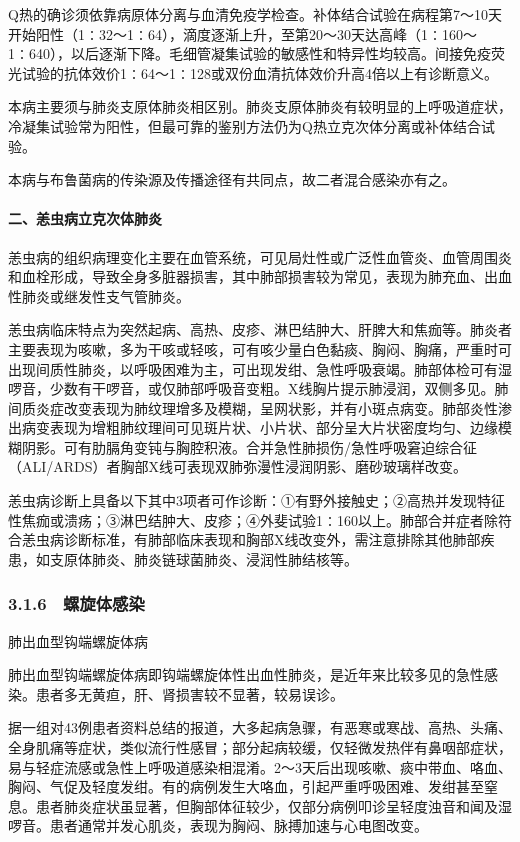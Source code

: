 Q热的确诊须依靠病原体分离与血清免疫学检查。补体结合试验在病程第7～10天开始阳性（1∶32～1∶64），滴度逐渐上升，至第20～30天达高峰（1∶160～1∶640），以后逐渐下降。毛细管凝集试验的敏感性和特异性均较高。间接免疫荧光试验的抗体效价1∶64～1∶128或双份血清抗体效价升高4倍以上有诊断意义。

本病主要须与肺炎支原体肺炎相区别。肺炎支原体肺炎有较明显的上呼吸道症状，冷凝集试验常为阳性，但最可靠的鉴别方法仍为Q热立克次体分离或补体结合试验。

本病与布鲁菌病的传染源及传播途径有共同点，故二者混合感染亦有之。

\paragraph{二、恙虫病立克次体肺炎}

恙虫病的组织病理变化主要在血管系统，可见局灶性或广泛性血管炎、血管周围炎和血栓形成，导致全身多脏器损害，其中肺部损害较为常见，表现为肺充血、出血性肺炎或继发性支气管肺炎。

恙虫病临床特点为突然起病、高热、皮疹、淋巴结肿大、肝脾大和焦痂等。肺炎者主要表现为咳嗽，多为干咳或轻咳，可有咳少量白色黏痰、胸闷、胸痛，严重时可出现间质性肺炎，以呼吸困难为主，可出现发绀、急性呼吸衰竭。肺部体检可有湿啰音，少数有干啰音，或仅肺部呼吸音变粗。X线胸片提示肺浸润，双侧多见。肺间质炎症改变表现为肺纹理增多及模糊，呈网状影，并有小斑点病变。肺部炎性渗出病变表现为增粗肺纹理间可见斑片状、小片状、部分呈大片状密度均匀、边缘模糊阴影。可有肋膈角变钝与胸腔积液。合并急性肺损伤/急性呼吸窘迫综合征（ALI/ARDS）者胸部X线可表现双肺弥漫性浸润阴影、磨砂玻璃样改变。

恙虫病诊断上具备以下其中3项者可作诊断：①有野外接触史；②高热并发现特征性焦痂或溃疡；③淋巴结肿大、皮疹；④外斐试验1∶160以上。肺部合并症者除符合恙虫病诊断标准，有肺部临床表现和胸部X线改变外，需注意排除其他肺部疾患，如支原体肺炎、肺炎链球菌肺炎、浸润性肺结核等。

\subsubsection{3.1.6　螺旋体感染}

肺出血型钩端螺旋体病

肺出血型钩端螺旋体病即钩端螺旋体性出血性肺炎，是近年来比较多见的急性感染。患者多无黄疸，肝、肾损害较不显著，较易误诊。

据一组对43例患者资料总结的报道，大多起病急骤，有恶寒或寒战、高热、头痛、全身肌痛等症状，类似流行性感冒；部分起病较缓，仅轻微发热伴有鼻咽部症状，易与轻症流感或急性上呼吸道感染相混淆。2～3天后出现咳嗽、痰中带血、咯血、胸闷、气促及轻度发绀。有的病例发生大咯血，引起严重呼吸困难、发绀甚至窒息。患者肺炎症状虽显著，但胸部体征较少，仅部分病例叩诊呈轻度浊音和闻及湿啰音。患者通常并发心肌炎，表现为胸闷、脉搏加速与心电图改变。

